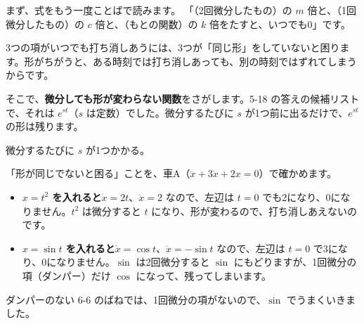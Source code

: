 

\label{bk:6-12:oku}まず、式をもう一度ことばで読みます。
「（2回微分したもの）の $m$ 倍と、（1回微分したもの）の $c$ 倍と、（もとの関数）の $k$ 倍をたすと、いつでも0」です。

\par\vspace{4pt}\noindent\begin{minipage}[c]{0.56\linewidth}
\raggedright
3つの項がいつでも打ち消しあうには、3つが「同じ形」をしていないと困ります。形がちがうと、ある時刻では打ち消しあっても、別の時刻ではずれてしまうからです。

そこで、\textbf{微分しても形が変わらない関数}をさがします。5-18 の答えの候補リストで、それは $e^{st}$（$s$ は定数）でした。微分するたびに $s$ が1つ前に出るだけで、$e^{st}$ の形は残ります。
\end{minipage}\hfill
\begin{minipage}[c]{0.4\linewidth}
\centering
{}\par\vspace{3pt}
{\footnotesize 微分するたびに $s$ が1つかかる。}
\end{minipage}

「形が同じでないと困る」ことを、車A（$\ddot x+3\dot x+2x=0$）で確かめます。
\begin{itemize}[leftmargin=1.2\zw, itemsep=2pt, topsep=2pt, label={\color{\bkTT}●}]
\item \textbf{$x=t^2$ を入れると}\quad $\dot x=2t$、$\ddot x=2$ なので、左辺は
$t=0$ でも2になり、0になりません。$t^2$ は微分すると $t$ になり、形が変わるので、打ち消しあえないのです。
\item \textbf{$x=\sin t$ を入れると}\quad $\dot x=\cos t$、$\ddot x=-\sin t$ なので、左辺は
$t=0$ で3になり、0になりません。$\sin$ は2回微分すると $\sin$ にもどりますが、1回微分の項（ダンパー）だけ $\cos$ になって、残ってしまいます。
\end{itemize}
ダンパーのない 6-6 のばねでは、1回微分の項がないので、$\sin$ でうまくいきました。


